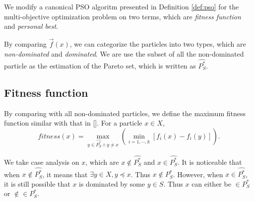 \documentclass[12pt]{article}
\begin{document}
We modify a canonical PSO algoritm presented in Definition \ref{def:pso} for the multi-objective optimization problem on two terms, which are \emph{fitness function} and \emph{personal best}.

By comparing $ \vec{f}(x) $, we can categorize the particles into two types, which are \emph{non-dominated} and \emph{dominated}.
We are use the subset of all the non-dominated particle as the estimation of the Pareto set, which is written as $ \hat{P^{*}_{S}} $.

\subsection{Fitness function}

By comparing with all non-dominated particles, we define the maximum fitness function similar with that in [\cite{li2004better}].
For a particle $ x \in X $,
\begin{equation}
\label{eq:maximin_fitness}
fitness(x) = \max_{y \in \hat{P^{*}_{S}} \land y \neq x} \left( \min_{i=1, \cdots , k} [ f_{i}(x) - f_{i}(y) ] \right).
\end{equation}

We take case analysis on $ x $, which are $ x \notin \hat{P^{*}_{S}} $ and $ x \in \hat{P^{*}_{S}} $.
It is noticeable that when $ x \notin \hat{P^{*}_{S}} $, it means that $ \exists y \in X, y \preceq x $. Thus $ x \not \in P^{*}_{S} $.
However, when $ x \in \hat{P^{*}_{S}} $, it is still possible that $ x $ is dominated by some $ y \in S $. Thus $ x $ can either be $ \in P^{*}_{S} $ or $ \notin \in P^{*}_{S} $.
\end{document}
